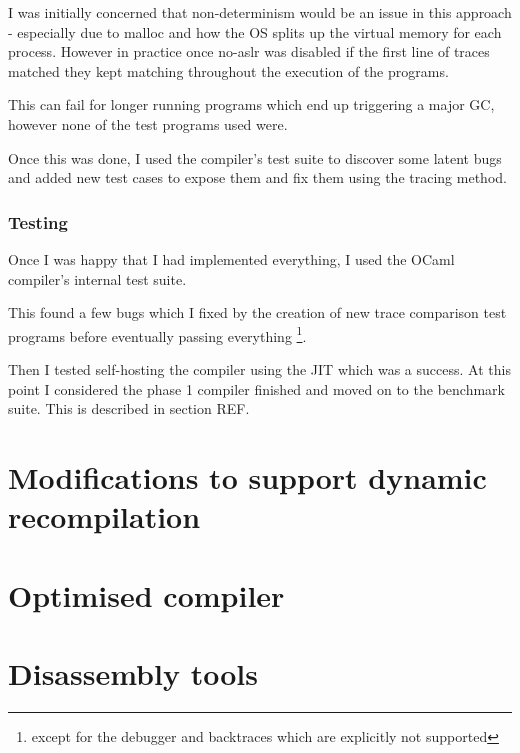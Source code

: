 I was initially concerned that non-determinism would be an issue in this approach - especially
due to malloc and how the OS splits up the virtual memory for each process. However in practice
once no-aslr was disabled if the first line of traces matched they kept matching throughout the
execution of the programs.

This can fail for longer running programs which end up triggering a major GC, however none of the
test programs used were.

Once this was done, I used the compiler's test suite to discover some latent bugs and added new
test cases to expose them and fix them using the tracing method.

\subsubsection{Testing}

Once I was happy that I had implemented everything, I used the OCaml compiler's internal test
suite.

This found a few bugs which I fixed by the creation of new trace comparison test programs before
eventually passing
everything \footnote{except for the debugger and backtraces which are explicitly not supported}.

Then I tested self-hosting the compiler using the JIT which was a success. At this point I
considered the phase 1 compiler finished and moved on to the benchmark suite. This is described in
section REF.

\section{Modifications to support dynamic recompilation}

\section{Optimised compiler}

\section{Disassembly tools}